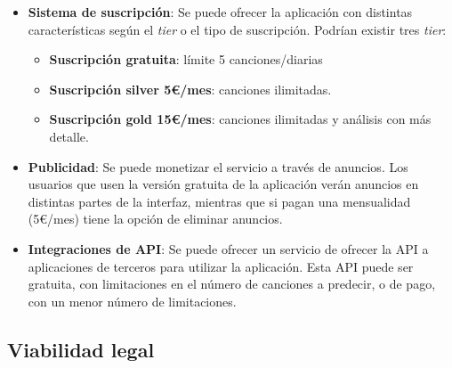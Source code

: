 \begin{itemize}
\tightlist

\item \textbf{Sistema de suscripción}: Se puede ofrecer la aplicación con distintas características según el \textit{tier} o el tipo de suscripción. Podrían existir tres \textit{tier}:
	\begin{itemize}
	\tightlist
	\item \textbf{Suscripción gratuita}: límite 5 canciones/diarias

	\item \textbf{Suscripción silver 5€/mes}: canciones ilimitadas.

	\item \textbf{Suscripción gold 15€/mes}: canciones ilimitadas y análisis con más detalle.
	\end{itemize}

\item \textbf{Publicidad}: Se puede monetizar el servicio a través de anuncios. Los usuarios que usen la versión gratuita de la aplicación verán anuncios en distintas partes de la interfaz, mientras que si pagan una mensualidad (5€/mes) tiene la opción de eliminar anuncios.

\item \textbf{Integraciones de API}: Se puede ofrecer un servicio de ofrecer la API a aplicaciones de terceros para utilizar la aplicación. Esta API puede ser gratuita, con limitaciones en el número de canciones a predecir, o de pago, con un menor número de limitaciones.
\end{itemize}

\subsection{Viabilidad legal}